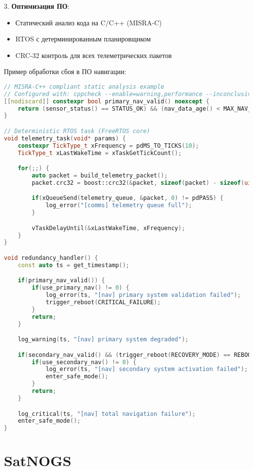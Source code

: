 3. \textbf{Оптимизация ПО}:
\begin{itemize}
	\item Статический анализ кода на C/C++ (MISRA-C)
	\item RTOS с детерминированным планировщиком
	\item CRC-32 контроль для всех телеметрических пакетов
\end{itemize}

Пример обработки сбоя в ПО навигации:
\begin{lstlisting}[language=C++]
// MISRA-C++ compliant static analysis example
// Configured with: cppcheck --enable=warning,performance --inconclusive --std=c++17
[[nodiscard]] constexpr bool primary_nav_valid() noexcept {
    return (sensor_status() == STATUS_OK) && (nav_data_age() < MAX_NAV_AGE);
}

// Deterministic RTOS task (FreeRTOS core)
void telemetry_task(void* params) {
    constexpr TickType_t xFrequency = pdMS_TO_TICKS(10);
    TickType_t xLastWakeTime = xTaskGetTickCount();

    for(;;) {
        auto packet = build_telemetry_packet();
        packet.crc32 = boost::crc32(&packet, sizeof(packet) - sizeof(uint32_t));

        if(xQueueSend(telemetry_queue, &packet, 0) != pdPASS) {
            log_error("[comms] telemetry queue full");
        }

        vTaskDelayUntil(&xLastWakeTime, xFrequency);
    }
}

void redundancy_handler() {
    const auto ts = get_timestamp();

    if(primary_nav_valid()) {
        if(use_primary_nav() != 0) {
            log_error(ts, "[nav] primary system validation failed");
            trigger_reboot(CRITICAL_FAILURE);
        }
        return;
    }

    log_warning(ts, "[nav] primary system degraded");

    if(secondary_nav_valid() && (trigger_reboot(RECOVERY_MODE) == REBOOT_SUCCESS)) {
        if(use_secondary_nav() != 0) {
            log_error(ts, "[nav] secondary system activation failed");
            enter_safe_mode();
        }
        return;
    }

    log_critical(ts, "[nav] total navigation failure");
    enter_safe_mode();
}
\end{lstlisting}

\section{SatNOGS}

